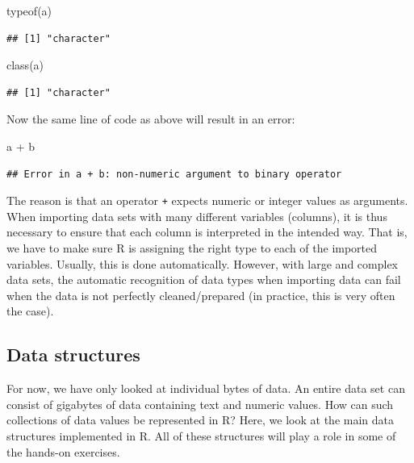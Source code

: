 \documentclass[
  12pt,
]{style/krantz}
\newenvironment{Shaded}{\begin{snugshade}}{\end{snugshade}}
\newcommand{\FunctionTok}[1]{\textcolor[rgb]{0.00,0.00,0.00}{#1}}
\newcommand{\NormalTok}[1]{#1}
\newcommand{\SpecialCharTok}[1]{\textcolor[rgb]{0.00,0.00,0.00}{#1}}
\begin{document}
\begin{Shaded}
\begin{Highlighting}[]
\FunctionTok{typeof}\NormalTok{(a)}
\end{Highlighting}
\end{Shaded}

\begin{verbatim}
## [1] "character"
\end{verbatim}

\begin{Shaded}
\begin{Highlighting}[]
\FunctionTok{class}\NormalTok{(a)}
\end{Highlighting}
\end{Shaded}

\begin{verbatim}
## [1] "character"
\end{verbatim}

Now the same line of code as above will result in an error:

\begin{Shaded}
\begin{Highlighting}[]
\NormalTok{a }\SpecialCharTok{+}\NormalTok{ b}
\end{Highlighting}
\end{Shaded}

\begin{verbatim}
## Error in a + b: non-numeric argument to binary operator
\end{verbatim}

The reason is that an operator \texttt{+} expects numeric or integer values as arguments. When importing data sets with many different variables (columns), it is thus necessary to ensure that each column is interpreted in the intended way. That is, we have to make sure R is assigning the right type to each of the imported variables. Usually, this is done automatically. However, with large and complex data sets, the automatic recognition of data types when importing data can fail when the data is not perfectly cleaned/prepared (in practice, this is very often the case).

\hypertarget{data-structures}{%
\subsection{Data structures}\label{data-structures}}

For now, we have only looked at individual bytes of data. An entire data set can consist of gigabytes of data containing text and numeric values. How can such collections of data values be represented in R? Here, we look at the main data structures implemented in R. All of these structures will play a role in some of the hands-on exercises.
\end{document}
